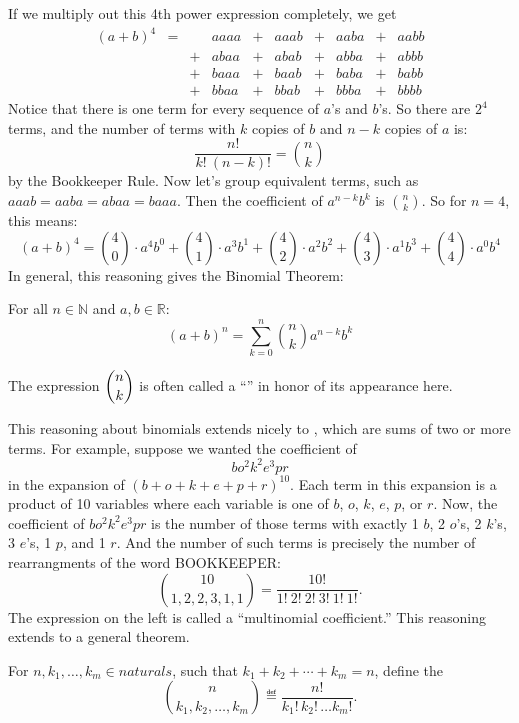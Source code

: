 If we multiply out this 4th power expression completely, we get
\[\begin{array}{rccccccccc}
(a + b)^4
   & = &    & aaaa & + & aaab & + & aaba & + & aabb \\
   &   &  + & abaa & + & abab & + & abba & + & abbb \\
   &   &  + & baaa & + & baab & + & baba & + & babb \\
   &   &  + & bbaa & + & bbab & + & bbba & + & bbbb
\end{array}\]
Notice that there is one term for every sequence of $a$'s and $b$'s.  So
there are $2^4$ terms, and the number of terms with $k$ copies of $b$ and
$n - k$ copies of $a$ is:
\[
\frac{n!}{k!\ (n-k)!} = \binom{n}{k}
\]
by the Bookkeeper Rule.  Now let's group equivalent terms, such as
$aaab = aaba = abaa = baaa$.  Then the coefficient of $a^{n-k} b^k$ is
$\binom{n}{k}$.  So for $n = 4$, this means:
\[
(a + b)^4 =
    \binom{4}{0} \cdot a^4 b^0 + 
    \binom{4}{1} \cdot a^3 b^1 + 
    \binom{4}{2} \cdot a^2 b^2 + 
    \binom{4}{3} \cdot a^1 b^3 + 
    \binom{4}{4} \cdot a^0 b^4
\]
In general, this reasoning gives the Binomial Theorem:

\begin{theorem}
For all $n \in \mathbb{N}$ and $a, b \in \mathbb{R}$:
%
\[
(a + b)^n = \sum_{k=0}^n \binom{n}{k} a^{n-k} b^k
\]
\end{theorem}

The expression $\dbinom{n}{k}$ is often called a ``'' in honor of its appearance here.

This reasoning about binomials extends nicely to ,
which are sums of two or more terms.  For example, suppose we wanted
the coefficient of
%
\[
b o^2 k^2 e^3 p r
\]
%
in the expansion of $(b + o + k + e + p + r)^{10}$.  Each term in this
expansion is a product of 10 variables where each variable is one of
$b$, $o$, $k$, $e$, $p$, or $r$.  Now, the coefficient of $b o^2 k^2
e^3 p r$ is the number of those terms with exactly 1 $b$, 2 $o$'s, 2
$k$'s, 3 $e$'s, 1 $p$, and 1 $r$.  And the number of such terms is
precisely the number of rearrangments of the word BOOKKEEPER:
\[
\binom{10}{1,2,2,3,1,1} = \frac{10!}{1!\ 2!\ 2!\ 3!\ 1!\ 1!}.
\]
The expression on the left is called a ``multinomial coefficient.''  This
reasoning extends to a general theorem.

\begin{definition}
For $n,k_1,\dots,k_m \in naturals$, such that $k_1+k_2+\cdots+k_m = n$,
define the 
\[
\binom{n}{k_1, k_2, \dots, k_m} \eqdef \frac{n!}{k_1!\, k_2!\, \dots k_m!}.
\]
\end{definition}

